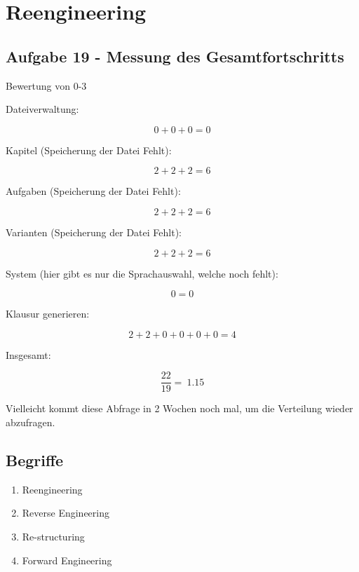 \documentclass[a4paper]{article}
\title{\docTitle}
\author{Moritz}
\date{\today}
\begin{document}
\maketitle
\tableofcontents


\section{Reengineering}

\subsection{Aufgabe 19 - Messung des Gesamtfortschritts}

Bewertung von 0-3

Dateiverwaltung:

\[
0+0+0 = 0
\]

Kapitel (Speicherung der Datei Fehlt):

\[
2+2+2 = 6
\]

Aufgaben (Speicherung der Datei Fehlt):

\[
2+2+2 = 6
\]

Varianten (Speicherung der Datei Fehlt):

\[
2+2+2 = 6
\]

System (hier gibt es nur die Sprachauswahl, welche noch fehlt):

\[
0 = 0
\]

Klausur generieren:

\[
2+2+0+0+0+0 = 4
\]

Insgesamt: 

\[
\frac{22}{19} = ~1.15
\]

Vielleicht kommt diese Abfrage in 2 Wochen noch mal, um die Verteilung wieder abzufragen.

\subsection{Begriffe}

\begin{enumerate}
    \item Reengineering
    \item Reverse Engineering
    \item Re-structuring
    \item Forward Engineering
\end{enumerate}

\end{document}
